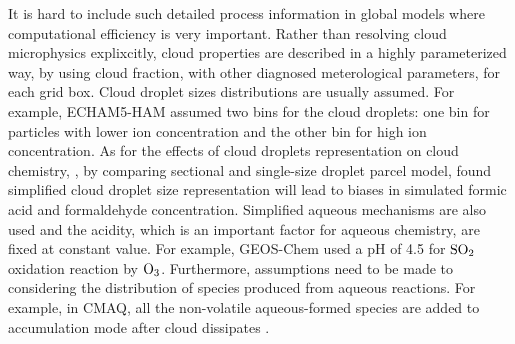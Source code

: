 \documentclass[edeposit,fullpage]{uiucthesis2009}
\begin{document}
It is hard to include such detailed process information in global
models where computational efficiency is very important. Rather than
resolving cloud microphysics explixcitly, cloud properties are
described in a highly parameterized way, by using cloud fraction, with
other diagnosed meterological parameters, for each grid box. Cloud
droplet sizes distributions are usually assumed. For example,
ECHAM5-HAM assumed two bins for the cloud droplets: one bin for
particles with lower ion concentration and the other bin for high ion
concentration. As for the effects of cloud droplets representation on
cloud chemistry, \citet{barth2006importance}, by comparing sectional
and single-size droplet parcel model, found simplified cloud droplet
size representation will lead to biases in simulated formic acid and
formaldehyde concentration. Simplified aqueous mechanisms are also
used and the acidity, which is an important factor for aqueous
chemistry, are fixed at constant value. For example, GEOS-Chem used a
pH of 4.5 for $\rm SO_2$ oxidation reaction by $\rm
O_3$\citep{park2004natural}. Furthermore, assumptions need to be made
to considering the distribution of species produced from aqueous
reactions. For example, in CMAQ, all the non-volatile aqueous-formed
species are added to accumulation mode after cloud dissipates
\citep{binkowski2003models, fahey2017framework}.
 
\end{document}
